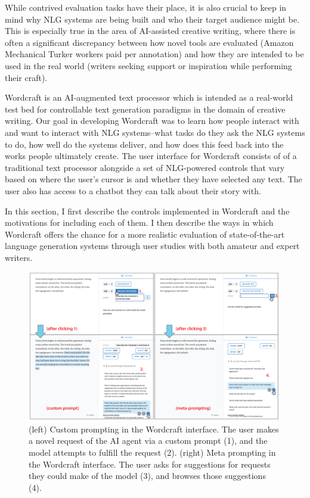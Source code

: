 While contrived evaluation tasks have their place, it is also crucial to keep in mind why NLG systems are being built and who their target audience might be.
This is especially true in the area of AI-assisted creative writing, where there is often a significant discrepancy between how novel tools are evaluated (Amazon Mechanical Turker workers paid per annotation) and how they are intended to be used in the real world (writers seeking support or inspiration while performing their craft).

Wordcraft is an AI-augmented text processor which is intended as a real-world test bed for controllable text generation paradigms in the domain of creative writing.
Our goal in developing Wordcraft was to learn how people interact with and want to interact with NLG systems--what tasks do they ask the NLG systems to do, how well do the systems deliver, and how does this feed back into the works people ultimately create.
The user interface for Wordcraft consists of of a traditional text processor alongside a set of NLG-powered controls that vary based on where the user's cursor is and whether they have selected any text.
The user also has access to a chatbot they can talk about their story with.

In this section, I first describe the controls implemented in Wordcraft and the motivations for including each of them.
I then describe the ways in which Wordcraft offers the chance for a more realistic evaluation of state-of-the-art language generation systems through user studies with both amateur and expert writers.

\begin{figure}[tbh]
  \centering
  \includegraphics[width=0.99\linewidth]{figures/interface_meta_custom}
  \caption{(left) Custom prompting in the Wordcraft interface. The user makes a novel request of the AI agent via a custom prompt (1), and the model attempts to fulfill the request (2). (right) Meta prompting in the Wordcraft interface. The user asks for suggestions for requests they could make of the model (3), and browses those suggestions (4).}
  \label{fig:interface_meta_custom}
\end{figure}


